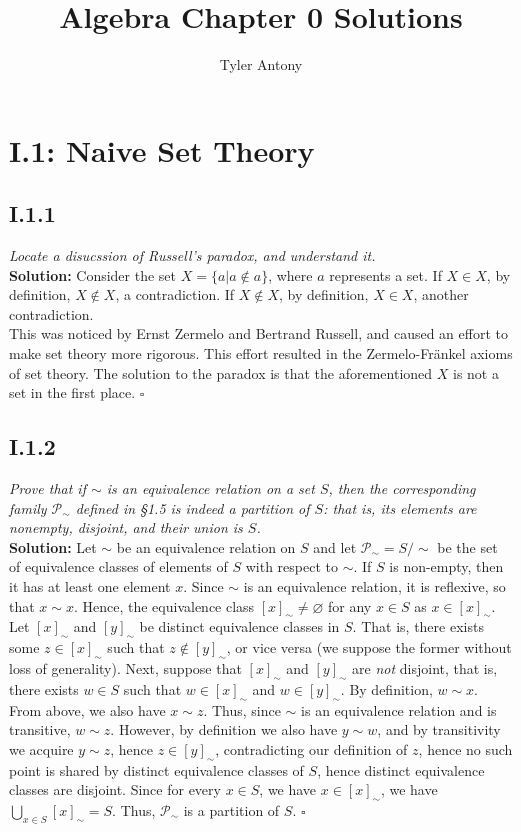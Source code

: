 \documentclass[11pt,a4paper]{article}
\author{Tyler Antony}
\title{Algebra Chapter 0 Solutions}
\begin{document}
\section*{I.1: Naive Set Theory}
\subsection*{I.1.1} \textit{Locate a disucssion of Russell's paradox, and understand it.} \\ 

\noindent \textbf{Solution:} Consider the set $X = \{a|a \notin a\}$, where $a$ represents a set.  If $X \in X$, by definition, $X \notin X$, a contradiction.  If $X \notin X$, by definition, $X \in X$, another contradiction. \\
This was noticed by Ernst Zermelo and Bertrand Russell, and caused an effort to make set theory more rigorous.  This effort resulted in the Zermelo-Fr{\"a}nkel axioms of set theory.  The solution to the paradox is that the aforementioned $X$ is not a set in the first place. $\square$

\subsection*{I.1.2} \textit{Prove that if $\sim$ is an equivalence relation on a set $S$, then the corresponding family $\mathscr{P}_{\sim}$ defined in \S 1.5 is indeed a partition of $S$: that is, its elements are nonempty, disjoint, and their union is $S$.} \\ 

\noindent\textbf{Solution:}  Let $\sim$ be an equivalence relation on $S$ and let $\mathscr{P}_{\sim} = S/\sim$ be the set of equivalence classes of elements of $S$ with respect to $\sim$.  If $S$ is non-empty, then it has at least one element $x$.  Since $\sim$ is an equivalence relation, it is reflexive, so that $x \sim x$.  Hence, the equivalence class $[x]_{\sim} \neq \varnothing$ for any $x \in S$ as $x \in [x]_{\sim}$. Let $[x]_{\sim}$ and $[y]_{\sim}$ be distinct equivalence classes in $S$.  That is, there exists some $z \in [x]_{\sim}$ such that $z \notin [y]_{\sim}$, or vice versa (we suppose the former without loss of generality).  Next, suppose that  $[x]_{\sim}$ and $[y]_{\sim}$ are \textit{not} disjoint, that is, there exists $w \in S$ such that $w \in [x]_{\sim}$ and $w \in [y]_{\sim}$.  By definition, $w \sim x$.  From above, we also have $x \sim z$.  Thus, since $\sim$ is an equivalence relation and is transitive, $w \sim z$.  However, by definition we also have $y \sim w$, and by transitivity we acquire $y \sim z$, hence $z \in [y]_{\sim}$, contradicting our definition of $z$, hence no such point is shared by distinct equivalence classes of $S$, hence distinct equivalence classes are disjoint.  Since for every $x \in S$, we have $x \in [x]_{\sim}$, we have $\bigcup_{x\in S}[x]_{\sim} = S$.  Thus, $\mathscr{P}_{\sim}$ is a partition of $S$. $\square$
\end{document}
